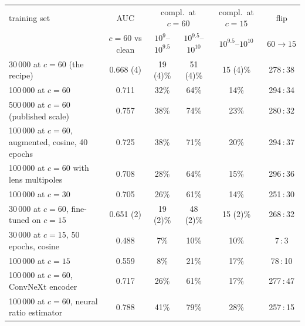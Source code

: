 \begin{tabular}{lccccc}
\toprule
training set & AUC & \multicolumn{2}{c}{compl.\ at $c{=}60$} & compl.\ at $c{=}15$ & flip \\
 & $c{=}60$ vs clean & $10^{9}$--$10^{9.5}$ & $10^{9.5}$--$10^{10}$ & $10^{9.5}$--$10^{10}$ & $60\to15$ \\
\midrule
30\,000 at $c=60$ (the recipe) & 0.668 (4) & 19 (4)\% & 51 (4)\% & 15 (4)\% & 278\,:\,38 \\
100\,000 at $c=60$ & 0.711 & 32\% & 64\% & 14\% & 294\,:\,34 \\
500\,000 at $c=60$ (published scale) & 0.757 & 38\% & 74\% & 23\% & 280\,:\,32 \\
100\,000 at $c=60$, augmented, cosine, 40 epochs & 0.725 & 38\% & 71\% & 20\% & 294\,:\,37 \\
100\,000 at $c=60$ with lens multipoles & 0.708 & 28\% & 64\% & 15\% & 296\,:\,36 \\
100\,000 at $c=30$ & 0.705 & 26\% & 61\% & 14\% & 251\,:\,30 \\
30\,000 at $c=60$, fine-tuned on $c=15$ & 0.651 (2) & 19 (2)\% & 48 (2)\% & 15 (2)\% & 268\,:\,32 \\
30\,000 at $c=15$, 50 epochs, cosine & 0.488 & 7\% & 10\% & 10\% & 7\,:\,3 \\
100\,000 at $c=15$ & 0.559 & 8\% & 21\% & 17\% & 78\,:\,10 \\
\midrule
100\,000 at $c=60$, ConvNeXt encoder & 0.717 & 26\% & 61\% & 17\% & 277\,:\,47 \\
100\,000 at $c=60$, neural ratio estimator & 0.788 & 41\% & 79\% & 28\% & 257\,:\,15 \\
\bottomrule
\end{tabular}
